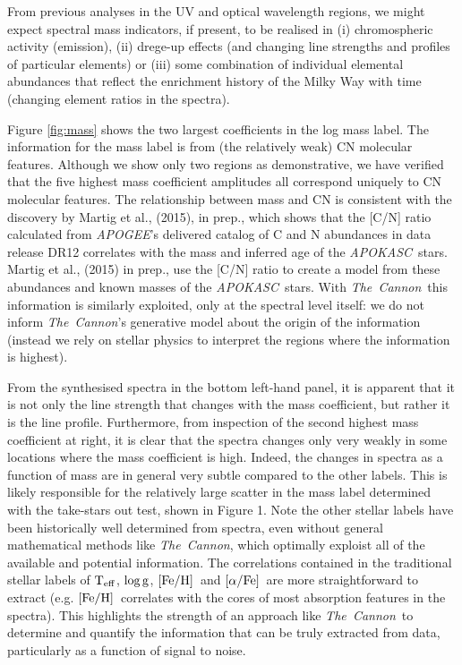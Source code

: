 \documentclass[12pt, preprint]{aastex}
\newcommand{\project}[1]{\textsl{#1}}
\newcommand{\tc}{\project{The~Cannon}}
\newcommand{\apogee}{\project{APOGEE}}
\newcommand{\apokasc}{\project{APOKASC}}
\newcommand{\teff}{\mbox{$\rm T_{eff}$}}
\newcommand{\feh}{\mbox{$\rm [Fe/H]$}}
\newcommand{\alphafe}{\mbox{$\rm [\alpha/Fe]$}}
\newcommand{\logg}{\mbox{$\rm \log g$}}
\begin{document}
From previous analyses in the UV and optical wavelength regions, we might expect spectral mass indicators, if present, to be realised in (i) chromospheric activity (emission), (ii) drege-up effects (and changing line strengths and profiles of particular elements) or (iii) some combination of individual elemental abundances that reflect the enrichment history of the Milky Way with time (changing element ratios in the spectra). 

Figure \ref{fig:mass} shows the two largest coefficients in the log mass label. The information for the mass label is from (the relatively weak) CN molecular features. Although we show only two regions as demonstrative, we have verified that the five highest mass coefficient amplitudes all correspond uniquely to CN molecular features. The relationship between mass and CN is consistent with the discovery by Martig et al., (2015), in prep., which shows that the [C/N] ratio calculated from \apogee's delivered catalog of C and N abundances in data release DR12 correlates with the mass and inferred age of the \apokasc\ stars. Martig et al., (2015) in prep., use the [C/N] ratio to create a model from these abundances and known masses of the \apokasc\ stars. With \tc\, this information is similarly exploited, only at the spectral level itself: we do not inform \tc's generative model about the origin of the information (instead we rely on stellar physics to interpret the regions where the information is highest). 

From the synthesised spectra in the bottom left-hand panel, it is apparent that it is not only the line strength that changes with the mass coefficient, but rather it is the line profile. Furthermore, from inspection of the second highest mass coefficient at right, it is clear that the spectra changes only very weakly in some locations where the mass coefficient is high. Indeed, the changes in spectra as a function of mass are in general very subtle compared to the other labels. This is likely responsible for the relatively large scatter in the mass label determined with the take-stars out test, shown in Figure 1. Note the other stellar labels have been historically well determined from spectra, even without general mathematical methods like \tc, which optimally exploist all of the available and potential information. The correlations contained in the traditional stellar labels of \teff, \logg, \feh\ and \alphafe\ are more straightforward to extract (e.g. \feh\ correlates with the cores of most absorption features in the spectra). This highlights the strength of an approach like \tc\ to determine and quantify the information that can be truly extracted from data, particularly as a function of signal to noise. 
\end{document}
